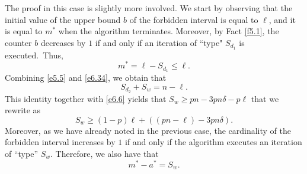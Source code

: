 \documentclass[10pt,a4paper]{amsart}
\theoremstyle{remark}
\newcommand{\meg}{\geqslant}
\newcommand{\mik}{\leqslant}
\begin{document}
The proof in this case is slightly more involved.
We start by observing that the initial value of the upper bound $b$ of the forbidden interval is equal to $\ell$,
and it is equal to $m^*$ when the algorithm terminates. Moreover, by Fact \ref{f5.1}, the counter $b$ decreases
by $1$ if and only if an iteration of ``type" $S_{d_1}$ is executed.~Thus,
\begin{equation} \label{e6.34}
m^*=\ell-S_{d_1}\mik \ell.
\end{equation}
Combining \eqref{e5.5} and \eqref{e6.34}, we obtain that
\begin{equation} \label{e6.35}
S_{d_2}+S_w=n-\ell.
\end{equation}
This identity together with \eqref{e6.6} yields that $S_w\meg pn-3pn\delta-p\ell$ that we rewrite as
\begin{equation} \label{e6.36}
S_w\meg (1-p)\ell+\left(\left(pn-\ell\right)-3pn\delta\right).
\end{equation}
Moreover, as we have already noted in the previous case, the cardinality of the forbidden interval increases by $1$
if and only if the algorithm executes an iteration of ``type'' $S_w$. Therefore, we also have that
\begin{equation} \label{e6.37}
m^*-a^*=S_w.
\end{equation}
\end{document}
